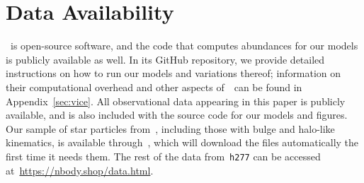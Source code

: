 \documentclass[draft2.tex]{subfiles}
\begin{document}
 

\section{Data Availability} 
\label{sec:data_availability} 

\vice~is open-source software, and the code that computes abundances for our 
models is publicly available as well. 
In its GitHub repository, we provide detailed instructions on how to run our 
models and variations thereof; information on their computational overhead and 
other aspects of~\vice~can be found in Appendix~\ref{sec:vice}. 
All observational data appearing in this paper is publicly available, and is 
also included with the source code for our models and figures. 
Our sample of star particles from~\hsim, including those with bulge and 
halo-like kinematics, is available through~\vice, which will download the files 
automatically the first time it needs them. The rest of the data 
from~\texttt{h277} can be accessed at~\url{https://nbody.shop/data.html}. 
\end{document}
